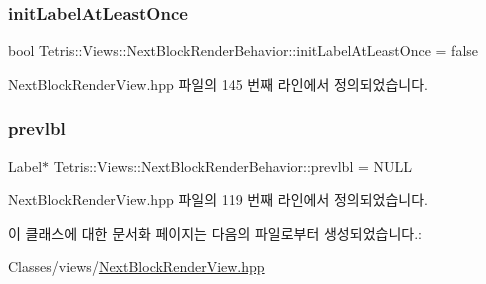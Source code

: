 \subsubsection{\texorpdfstring{init\+Label\+At\+Least\+Once}{initLabelAtLeastOnce}}
{\footnotesize\ttfamily bool Tetris\+::\+Views\+::\+Next\+Block\+Render\+Behavior\+::init\+Label\+At\+Least\+Once = false\hspace{0.3cm}{\ttfamily [protected]}}



Next\+Block\+Render\+View.\+hpp 파일의 145 번째 라인에서 정의되었습니다.

\mbox{\label{class_tetris_1_1_views_1_1_next_block_render_behavior_afc0dbfd7dbdf66e88a804a109b470546}} 
\subsubsection{\texorpdfstring{prevlbl}{prevlbl}}
{\footnotesize\ttfamily Label$\ast$ Tetris\+::\+Views\+::\+Next\+Block\+Render\+Behavior\+::prevlbl = N\+U\+LL\hspace{0.3cm}{\ttfamily [protected]}}



Next\+Block\+Render\+View.\+hpp 파일의 119 번째 라인에서 정의되었습니다.



이 클래스에 대한 문서화 페이지는 다음의 파일로부터 생성되었습니다.\+:\begin{DoxyCompactItemize}
\item 
Classes/views/\hyperlink{_next_block_render_view_8hpp}{Next\+Block\+Render\+View.\+hpp}\end{DoxyCompactItemize}
